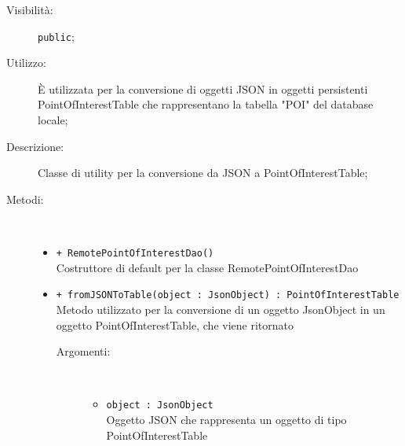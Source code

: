 \documentclass[../DefinizioneDiProdotto.tex]{subfiles}
\begin{document}
\begin{description}
\begin{itemize}
	\end{itemize}
	\item[Visibilità:] \texttt{public};
	\item[Utilizzo:] È utilizzata per la conversione di oggetti JSON in oggetti persistenti PointOfInterestTable che rappresentano la tabella "POI" del database locale;
	\item[Descrizione:] Classe di utility per la conversione da JSON a PointOfInterestTable;
	\item[Metodi:] \
	\begin{itemize}
		\item \texttt{+ RemotePointOfInterestDao()}\\
		Costruttore di default per la classe RemotePointOfInterestDao
		\item \texttt{+ fromJSONToTable(object : JsonObject) : PointOfInterestTable}\\
		Metodo utilizzato per la conversione di un oggetto JsonObject in un oggetto PointOfInterestTable, che viene ritornato
		\begin{description}
			\item[Argomenti:] \
			\begin{itemize}
				\item \texttt{object : JsonObject}\\
				Oggetto JSON che rappresenta un oggetto di tipo PointOfInterestTable\end{itemize}
		\end{description}
	\end{itemize}
\end{description}
\end{document}
